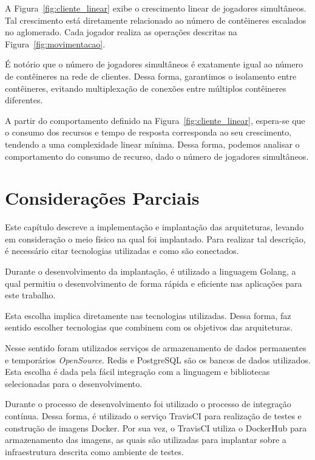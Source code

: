 A Figura~\ref{fig:cliente_linear} exibe o crescimento linear de jogadores simultâneos.
%
Tal crescimento está diretamente relacionado ao número de contêineres escalados no aglomerado.
%
Cada jogador realiza as operações descritas na Figura~\ref{fig:movimentacao}.

É notório que o número de jogadores simultâneos é exatamente igual ao número de contêineres na rede de clientes.
%
Dessa forma, garantimos o isolamento entre contêineres, evitando multiplexação de conexões entre múltiplos contêineres diferentes.


A partir do comportamento definido na Figura~\ref{fig:cliente_linear}, espera-se que o consumo dos recursos e tempo de resposta corresponda ao seu crescimento, tendendo a uma complexidade linear mínima.
%
Dessa forma, podemos analisar o comportamento do consumo de recurso, dado o número de jogadores simultâneos.


\section{Considerações Parciais}

Este capítulo descreve a implementação e implantação das arquiteturas, levando em consideração o meio físico na qual foi implantado.
%
Para realizar tal descrição, é necessário citar tecnologias utilizadas e como são conectados.

Durante o desenvolvimento da implantação, é utilizado a linguagem Golang, a qual permitiu o desenvolvimento de forma rápida e eficiente nas aplicações para este trabalho.

Esta escolha implica diretamente nas tecnologias utilizadas.
%
Dessa forma, faz sentido escolher tecnologias que combinem com os objetivos das arquiteturas.

Nesse sentido foram utilizados serviços de armazenamento de dados permanentes e temporários \textit{OpenSource}.
%
Redis e PostgreSQL são os bancos de dados utilizados.
%
Esta escolha é dada pela fácil integração com a linguagem e bibliotecas selecionadas para o desenvolvimento.

Durante o processo de desenvolvimento foi utilizado o processo de integração contínua.
%
Dessa forma, é utilizado o serviço TravisCI para realização de testes e construção de imagens Docker.
%
Por sua vez, o TravisCI utiliza o DockerHub para armazenamento das imagens, as quais são utilizadas para implantar sobre a infraestrutura descrita como ambiente de testes.
